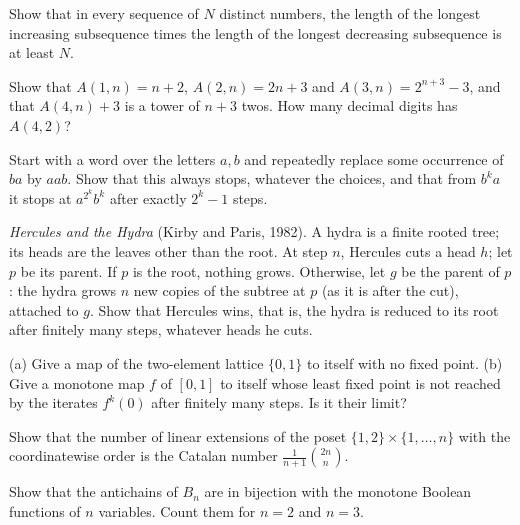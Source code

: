 \begin{exercise}[$\star$]\label{ex:esproduct}
Show that in every sequence of $N$ distinct numbers, the length of the longest increasing subsequence times the length of
the longest decreasing subsequence is at least $N$.
\end{exercise}

\begin{exercise}[$\star$]\label{ex:ackermannvalues}
Show that $A(1,n)=n+2$, $A(2,n)=2n+3$ and $A(3,n)=2^{n+3}-3$, and that $A(4,n)+3$ is a tower of $n+3$ twos. How many decimal digits has
$A(4,2)$?
\end{exercise}

\begin{exercise}[$\star\star$]\label{ex:rewriting}
Start with a word over the letters $a,b$ and repeatedly replace some occurrence of $ba$ by $aab$. Show that this always
stops, whatever the choices, and that from $b^ka$ it stops at $a^{2^k}b^k$ after exactly $2^k-1$ steps.
\end{exercise}

\begin{exercise}[$\star\star\star$]\label{ex:hydra}
\emph{Hercules and the Hydra} (Kirby and Paris, 1982). A hydra is a finite rooted tree; its heads are the leaves other than the
root. At step $n$, Hercules cuts a head $h$; let $p$ be its parent. If $p$ is the root, nothing grows. Otherwise, let $g$ be the parent
of $p$: the hydra grows $n$ new copies of the subtree at $p$ (as it is after the cut), attached to $g$. Show that Hercules wins, that is,
the hydra is reduced to its root after finitely many steps, whatever heads he cuts.
\end{exercise}

\begin{exercise}[$\star$]\label{ex:fixedpoints}
(a) Give a map of the two-element lattice $\{0,1\}$ to itself with no fixed point. (b) Give a monotone map $f$ of $[0,1]$ to itself
whose least fixed point is not reached by the iterates $f^k(0)$ after finitely many steps. Is it their limit?
\end{exercise}

\begin{exercise}[$\star\star$]\label{ex:youngtableaux}
Show that the number of linear extensions of the poset $\{1,2\}\times\{1,\dots,n\}$ with the coordinatewise order is the Catalan number
$\frac1{n+1}\binom{2n}n$.
\end{exercise}

\begin{exercise}[$\star$]\label{ex:dedekind}
Show that the antichains of $B_n$ are in bijection with the monotone Boolean functions of $n$ variables. Count them for $n=2$
and $n=3$.
\end{exercise}

